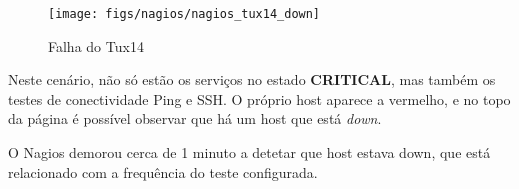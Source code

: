 \begin{figure}[H]
    \centering
    \texttt{[image: figs/nagios/nagios\_tux14\_down]}
    \caption{Falha do Tux14}
    \label{fig:nagios_tux14_down}
\end{figure}

Neste cenário, não só estão os serviços no estado \textbf{CRITICAL}, mas também os testes de conectividade Ping e SSH.
O próprio host aparece a vermelho, e no topo da página é possível observar que há um host que está \textit{down}.

O Nagios demorou cerca de 1 minuto a detetar que host estava down, que está relacionado com a frequência do teste configurada.